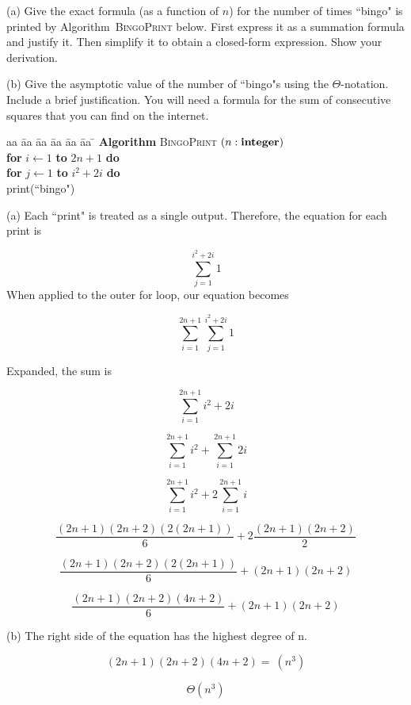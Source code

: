 
\begin{problem}
(a)
Give the exact formula (as a function of $n$) for the number of
times ``bingo" is printed by Algorithm~\textsc{BingoPrint} below.
First express it as a summation formula and justify it. Then simplify it to 
obtain a closed-form expression. Show your derivation.

\noindent
(b)
Give the asymptotic value of the
number of ``bingo"s using the $\Theta$-notation. Include a brief justification. You will need a formula
for the sum of consecutive squares that you can find on the internet.

\begin{tabbing}
aa \= aa \= aa \= aa \= aa \= aa \= \kill
\textbf{Algorithm} \textsc{BingoPrint} $(n: \mbox{\bf integer})$ \\
      \> \textbf{for} $i \leftarrow 1$ \textbf{to} $2n+1$
                         \textbf{do} \\
      \> \> \textbf{for} $j \leftarrow 1$ \textbf{to} $i^2+2i$ \textbf{do} \\
      \> \> \> print(``bingo")
\end{tabbing}
\end{problem}

\begin{solution}
(a) Each ``print" is treated as a single output. Therefore, the equation for each print is

\[ \sum\limits_{j=1}^{i^2 + 2i} 1 \]
When applied to the outer for loop, our equation becomes

\[ \sum\limits_{i=1}^{2n+1}\sum\limits_{j=1}^{i^2 + 2i} 1 \]

Expanded, the sum is

\[ \sum\limits_{i=1}^{2n+1} i^2 + 2i \]

\[ \sum\limits_{i=1}^{2n+1} i^2 +  \sum\limits_{i=1}^{2n+1} 2i \]

\[ \sum\limits_{i=1}^{2n+1} i^2 +  2\sum\limits_{i=1}^{2n+1} i\]

\[ \frac{(2n+1)(2n+2)(2(2n+1))}{6} + 2\frac{(2n+1)(2n+2)}{2} \]

\[ \frac{(2n+1)(2n+2)(2(2n+1))}{6} + (2n+1)(2n+2) \]

\[ \frac{(2n+1)(2n+2)(4n+2)}{6} + (2n+1)(2n+2) \]

(b) The right side of the equation has the highest degree of n. 

\[ (2n+1)(2n+2)(4n+2) = ~(n^3) \]

\[ \Theta (n^3) \]

\end{solution}
